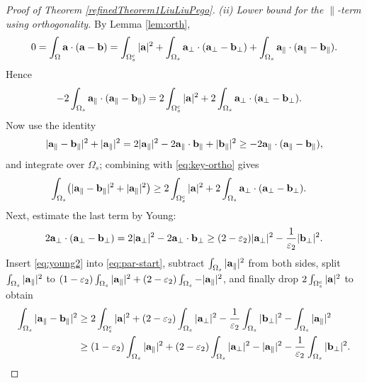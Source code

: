\documentclass{article}
\theoremstyle{definition}                   %
\begin{document}
\begin{proof}[Proof of Theorem \ref{refinedTheorem1LiuLiuPego}]
\emph{(ii) Lower bound for the $\parallel$-term using orthogonality.}
By Lemma \ref{lem:orth},
\[
0=\int_\Omega {\bf a}\cdot({\bf a}-{\bf b})
=\int_{\Omega_s^c}|{\bf a}|^2+\int_{\Omega_s}{\bf a}_\perp\cdot({\bf a}_\perp-{\bf b}_\perp)
+\int_{\Omega_s}{\bf a}_\parallel\cdot({\bf a}_\parallel-{\bf b}_\parallel).
\]
Hence
\begin{align}
-2\int_{\Omega_s}{\bf a}_\parallel\cdot({\bf a}_\parallel-{\bf b}_\parallel)
&=2\int_{\Omega_s^c}|{\bf a}|^2+2\int_{\Omega_s}{\bf a}_\perp\cdot({\bf a}_\perp-{\bf b}_\perp).
\label{eq:key-ortho}
\end{align}
Now use the identity
\[
|{\bf a}_\parallel-{\bf b}_\parallel|^2+|{\bf a}_\parallel|^2
=2|{\bf a}_\parallel|^2-2{\bf a}_\parallel\cdot{\bf b}_\parallel+|{\bf b}_\parallel|^2
\ge -2{\bf a}_\parallel\cdot({\bf a}_\parallel-{\bf b}_\parallel),
\]
and integrate over $\Omega_s$; combining with \eqref{eq:key-ortho} gives
\begin{align}
\int_{\Omega_s}\bigl(|{\bf a}_\parallel-{\bf b}_\parallel|^2+|{\bf a}_\parallel|^2\bigr)
&\ge 2\int_{\Omega_s^c}|{\bf a}|^2+2\int_{\Omega_s}{\bf a}_\perp\cdot({\bf a}_\perp-{\bf b}_\perp).
\label{eq:par-start}
\end{align}
Next, estimate the last term by Young:
\begin{align}
2{\bf a}_\perp\cdot({\bf a}_\perp-{\bf b}_\perp)
=2|{\bf a}_\perp|^2-2{\bf a}_\perp\cdot{\bf b}_\perp 
\ge (2-\varepsilon_2)|{\bf a}_\perp|^2-\frac{1}{\varepsilon_2}|{\bf b}_\perp|^2 .
\label{eq:young2}
\end{align}
Insert \eqref{eq:young2} into \eqref{eq:par-start}, 
 subtract $\int_{\Omega_s}|{\bf a}_\parallel|^2$ from both sides,  
 split $\int_{\Omega_s}|{\bf a}_\parallel|^2$ to $(1-\varepsilon_2) \int_{\Omega_s}|{\bf a}_\parallel|^2  + (2-\varepsilon_2)\int_{\Omega_s}-|{\bf a}_{\parallel}|^2$,
 and finally drop $2\int_{\Omega_s^c}|{\bf a}|^2$ 
  to obtain
\begin{align}
\int_{\Omega_s}|{\bf a}_\parallel-{\bf b}_\parallel|^2
&\ge
2\int_{\Omega_s^c}|{\bf a}|^2
+(2-\varepsilon_2)\int_{\Omega_s}|{\bf a}_\perp|^2
-\frac{1}{\varepsilon_2}\int_{\Omega_s}|{\bf b}_\perp|^2
-\int_{\Omega_s}|{\bf a}_\parallel|^2 \notag\\
&\ge 
(1-\varepsilon_2) \int_{\Omega_s}|{\bf a}_\parallel|^2 
+(2-\varepsilon_2)\int_{\Omega_s}|{\bf a}_\perp|^2
    -|{\bf a}_{\parallel}|^2
-\frac{1}{\varepsilon_2}\int_{\Omega_s}|{\bf b}_\perp|^2.
\label{eq:par}
\end{align}



\end{proof}
\end{document}
